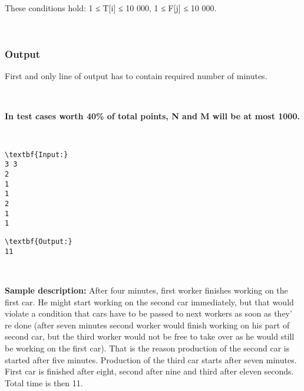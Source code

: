 These conditions hold: 1 ≤ T[i] ≤ 10 000, 1 ≤ F[j] ≤ 10 000.

 

\subsubsection{Output}

First and only line of output has to contain required number of minutes.

 

\textbf{In test cases worth 40\% of total points, N and M will be at most 1000. }

 
\begin{verbatim}
\textbf{Input:}
3 3
2
1
1
2
1
1
\end{verbatim}
\begin{verbatim}
\textbf{Output:}
11\end{verbatim}

 

\textbf{Sample description: } After four minutes, first worker finishes working on the first car. He might start working on the second car immediately, but that would violate a condition that cars have to be passed to next workers as soon as they' re done (after seven minutes second worker would finish working on his part of second car, but the third worker would not be free to take over as he would still be working on the first car). That is the reason production of the second car is started after five minutes. Production of the third car starts after seven minutes. First car is finished after eight, second after nine and third after eleven seconds. Total time is then 11.
